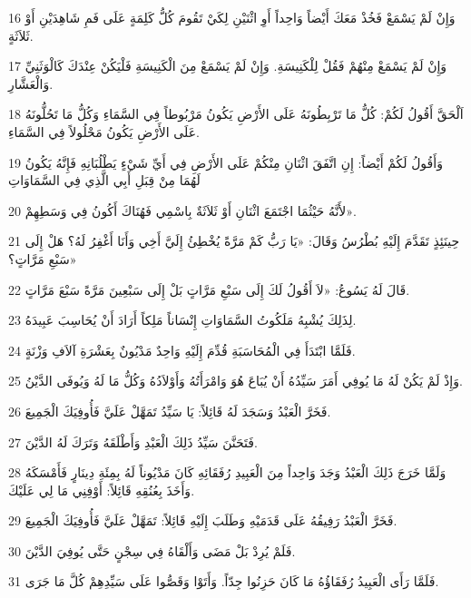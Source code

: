 \par 16 وَإِنْ لَمْ يَسْمَعْ فَخُذْ مَعَكَ أَيْضاً وَاحِداً أَوِ اثْنَيْنِ لِكَيْ تَقُومَ كُلُّ كَلِمَةٍ عَلَى فَمِ شَاهِدَيْنِ أَوْ ثَلاَثَةٍ.
\par 17 وَإِنْ لَمْ يَسْمَعْ مِنْهُمْ فَقُلْ لِلْكَنِيسَةِ. وَإِنْ لَمْ يَسْمَعْ مِنَ الْكَنِيسَةِ فَلْيَكُنْ عِنْدَكَ كَالْوَثَنِيِّ وَالْعَشَّارِ.
\par 18 اَلْحَقَّ أَقُولُ لَكُمْ: كُلُّ مَا تَرْبِطُونَهُ عَلَى الأَرْضِ يَكُونُ مَرْبُوطاً فِي السَّمَاءِ وَكُلُّ مَا تَحُلُّونَهُ عَلَى الأَرْضِ يَكُونُ مَحْلُولاً فِي السَّمَاءِ.
\par 19 وَأَقُولُ لَكُمْ أَيْضاً: إِنِ اتَّفَقَ اثْنَانِ مِنْكُمْ عَلَى الأَرْضِ فِي أَيِّ شَيْءٍ يَطْلُبَانِهِ فَإِنَّهُ يَكُونُ لَهُمَا مِنْ قِبَلِ أَبِي الَّذِي فِي السَّمَاوَاتِ
\par 20 لأَنَّهُ حَيْثُمَا اجْتَمَعَ اثْنَانِ أَوْ ثَلاَثَةٌ بِاسْمِي فَهُنَاكَ أَكُونُ فِي وَسَطِهِمْ».
\par 21 حِينَئِذٍ تَقَدَّمَ إِلَيْهِ بُطْرُسُ وَقَالَ: «يَا رَبُّ كَمْ مَرَّةً يُخْطِئُ إِلَيَّ أَخِي وَأَنَا أَغْفِرُ لَهُ؟ هَلْ إِلَى سَبْعِ مَرَّاتٍ؟»
\par 22 قَالَ لَهُ يَسُوعُ: «لاَ أَقُولُ لَكَ إِلَى سَبْعِ مَرَّاتٍ بَلْ إِلَى سَبْعِينَ مَرَّةً سَبْعَ مَرَّاتٍ.
\par 23 لِذَلِكَ يُشْبِهُ مَلَكُوتُ السَّمَاوَاتِ إِنْسَاناً مَلِكاً أَرَادَ أَنْ يُحَاسِبَ عَبِيدَهُ.
\par 24 فَلَمَّا ابْتَدَأَ فِي الْمُحَاسَبَةِ قُدِّمَ إِلَيْهِ وَاحِدٌ مَدْيُونٌ بِعَشْرَةِ آلاَفِ وَزْنَةٍ.
\par 25 وَإِذْ لَمْ يَكُنْ لَهُ مَا يُوفِي أَمَرَ سَيِّدُهُ أَنْ يُبَاعَ هُوَ وَامْرَأَتُهُ وَأَوْلاَدُهُ وَكُلُّ مَا لَهُ وَيُوفَى الدَّيْنُ.
\par 26 فَخَرَّ الْعَبْدُ وَسَجَدَ لَهُ قَائِلاً: يَا سَيِّدُ تَمَهَّلْ عَلَيَّ فَأُوفِيَكَ الْجَمِيعَ.
\par 27 فَتَحَنَّنَ سَيِّدُ ذَلِكَ الْعَبْدِ وَأَطْلَقَهُ وَتَرَكَ لَهُ الدَّيْنَ.
\par 28 وَلَمَّا خَرَجَ ذَلِكَ الْعَبْدُ وَجَدَ وَاحِداً مِنَ الْعَبِيدِ رُفَقَائِهِ كَانَ مَدْيُوناً لَهُ بِمِئَةِ دِينَارٍ فَأَمْسَكَهُ وَأَخَذَ بِعُنُقِهِ قَائِلاً: أَوْفِنِي مَا لِي عَلَيْكَ.
\par 29 فَخَرَّ الْعَبْدُ رَفِيقُهُ عَلَى قَدَمَيْهِ وَطَلَبَ إِلَيْهِ قَائِلاً: تَمَهَّلْ عَلَيَّ فَأُوفِيَكَ الْجَمِيعَ.
\par 30 فَلَمْ يُرِدْ بَلْ مَضَى وَأَلْقَاهُ فِي سِجْنٍ حَتَّى يُوفِيَ الدَّيْنَ.
\par 31 فَلَمَّا رَأَى الْعَبِيدُ رُفَقَاؤُهُ مَا كَانَ حَزِنُوا جِدّاً. وَأَتَوْا وَقَصُّوا عَلَى سَيِّدِهِمْ كُلَّ مَا جَرَى.
